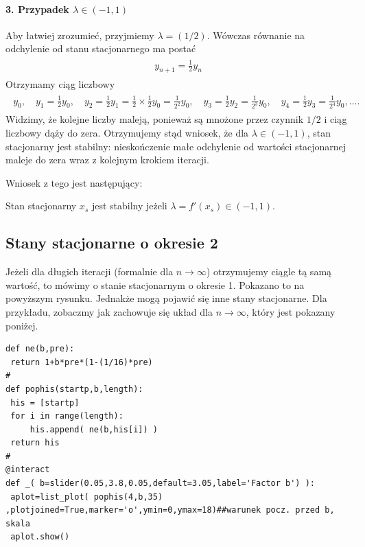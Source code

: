 \documentclass[a4paper,12pt,polish]{sphinxmanual}
\makeatletter
\renewenvironment{notice}[2]{\begin{icsebox}\def\py@noticetype{#1}\par\strong{#2}}{\end{icsebox}}\makeatother
\makeatother
\begin{document}
\paragraph{3. Przypadek $\lambda  \in (-1, 1)$}
\label{ch1/chI031:id2}
Aby łatwiej zrozumieć, przyjmiemy  $\lambda =  (1/2)$. Wówczas równanie na odchylenie od stanu stacjonarnego ma postać
\label{ch1/chI031:equation-eqn24}\begin{gather}
\begin{split}y_{n+1} = \frac{1}{2}  y_n\end{split}\label{ch1/chI031-eqn24}
\end{gather}
Otrzymamy ciąg liczbowy
\label{ch1/chI031:equation-eqn25}\begin{gather}
\begin{split} y_0, \quad y_1 =   \frac{1}{2} y_0, \quad y_2 =  \frac{1}{2}  y_1 =  \frac{1}{2} \times \frac{1}{2}  y_0 =\frac{1}{2^2}  y_0, \quad y_3 =  \frac{1}{2}  y_2 = \frac{1}{2^3}  y_0, \quad y_4 =  \frac{1}{2}  y_3 = \frac{1}{2^4}  y_0, ....\end{split}\label{ch1/chI031-eqn25}
\end{gather}
Widzimy, że  kolejne  liczby maleją, ponieważ są mnożone przez czynnik $1/2$
i ciąg liczbowy dąży do zera. Otrzymujemy stąd wniosek, że dla $\lambda  \in (-1, 1)$,
stan stacjonarny  jest stabilny: nieskończenie małe odchylenie od wartości stacjonarnej
maleje do zera  wraz z kolejnym krokiem iteracji.

Wniosek z tego jest następujący:

\begin{notice}{note}{Uwaga:}
Stan stacjonarny $x_s$ jest stabilny jeżeli $\lambda = f'(x_s) \in (-1, 1)$.
\end{notice}


\subsection{Stany stacjonarne o okresie 2}
\label{ch1/chI031:stany-stacjonarne-o-okresie-2}
Jeżeli dla długich iteracji (formalnie dla $n\to\infty$)  otrzymujemy ciągle tą samą wartość, to mówimy o stanie  stacjonarnym o okresie 1. Pokazano to na powyższym rysunku. Jednakże mogą pojawić się inne stany stacjonarne. Dla przykładu, zobaczmy jak zachowuje się układ dla $n\to\infty$, który jest pokazany poniżej.


\begin{verbatim}
def ne(b,pre):
 return 1+b*pre*(1-(1/16)*pre)
#
def pophis(startp,b,length):
 his = [startp]
 for i in range(length):
     his.append( ne(b,his[i]) )
 return his
#
@interact
def _( b=slider(0.05,3.8,0.05,default=3.05,label='Factor b') ):
 aplot=list_plot( pophis(4,b,35) ,plotjoined=True,marker='o',ymin=0,ymax=18)##warunek pocz. przed b, skala
 aplot.show()
\end{verbatim}
\end{document}
